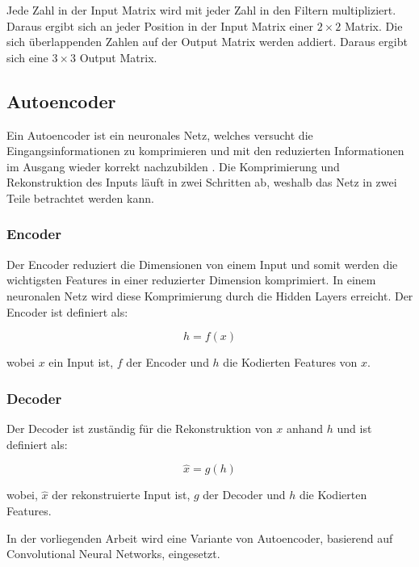 Jede Zahl in der Input Matrix wird mit jeder Zahl in den Filtern multipliziert. Daraus ergibt sich an jeder Position in der Input Matrix einer 
$ 2 \times 2 $ Matrix. Die sich überlappenden Zahlen auf der Output Matrix werden addiert. Daraus ergibt sich eine $ 3 \times 3 $ Output Matrix.

\subsection{Autoencoder}
Ein Autoencoder ist ein neuronales Netz, welches versucht die Eingangsinformationen zu komprimieren und mit den reduzierten Informationen 
im Ausgang wieder korrekt nachzubilden \cite{was-ist-autoencoder}. Die Komprimierung und Rekonstruktion des Inputs läuft in zwei Schritten ab, 
weshalb das Netz in zwei Teile betrachtet werden kann.
\\
\subsubsection{Encoder}
Der Encoder reduziert die Dimensionen von einem Input und somit werden die wichtigsten Features in einer reduzierter Dimension komprimiert.
In einem neuronalen Netz wird diese Komprimierung durch die Hidden Layers erreicht. Der Encoder ist definiert als:

\begin{equation}
  h = f(x)
\end{equation}

wobei $x$ ein Input ist, $f$ der Encoder und $h$ die Kodierten Features von $x$.

\subsubsection{Decoder}
Der Decoder ist zuständig für die Rekonstruktion von $x$ anhand $h$ und ist definiert als:

\begin{equation}
  \hat{x} = g(h)
\end{equation}

wobei, $\hat{x}$ der rekonstruierte Input ist, $g$ der Decoder und $h$ die Kodierten Features.

In der vorliegenden Arbeit wird eine Variante von Autoencoder, basierend auf Convolutional Neural Networks, eingesetzt.

